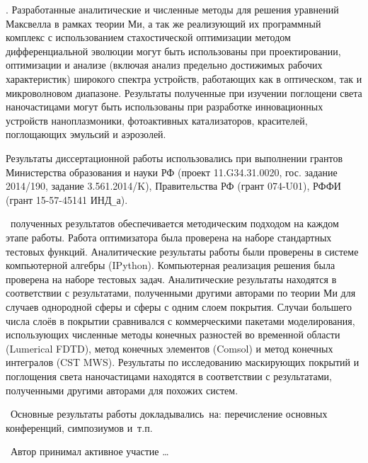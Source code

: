 \influence. Разработанные аналитические и численные методы для решения
уравнений Максвелла в рамках теории Ми, а так же реализующий их
программный комплекс с использованием стахостической оптимизации
методом дифференциальной эволюции могут быть использованы при
проектировании, оптимизации и анализе (включая анализ предельно
достижимых рабочих характеристик) широкого спектра устройств,
работающих как в оптическом, так и микроволновом диапазоне. Результаты
полученные при изучении поглощени света наночастицами могут быть
использованы при разработке инновационных устройств наноплазмоники,
фотоактивных катализаторов, красителей, поглощающих эмульсий и
аэрозолей.

Результаты диссертационной работы использовались при выполнении
грантов Министерства образования и науки РФ
(проект 11.G34.31.0020, гос. задание 2014/190, задание 3.561.2014/K),
Правительства РФ (грант 074-U01), РФФИ (грант 15-57-45141 ИНД\verb+_+а).


\reliability\ полученных результатов обеспечивается методическим
подходом на каждом этапе работы. Работа оптимизатора была проверена на
наборе стандартных тестовых функций. Аналитические результаты работы
были проверены в системе компьютерной алгебры (IPython). Компьютерная
реализация решения была проверена на наборе тестовых
задач. Аналитические результаты находятся в соответствии с
результатами, полученными другими авторами по теории Ми для случаев
однородной сферы и сферы с одним слоем покрытия.  Случаи большего
числа слоёв в покрытии сравнивался с коммерческими пакетами
моделирования, использующих численные методы конечных разностей во
временной области (Lumerical FDTD), метод конечных элементов (Comsol)
и метод конечных интегралов (CST MWS). Результаты по исследованию
маскирующих покрытий и поглощения света наночастицами находятся в
соответствии с результатами, полученными другими авторами для похожих
систем.

\probation\
Основные результаты работы докладывались~на:
перечисление основных конференций, симпозиумов и~т.\:п.

\contribution\ Автор принимал активное участие \ldots

 
